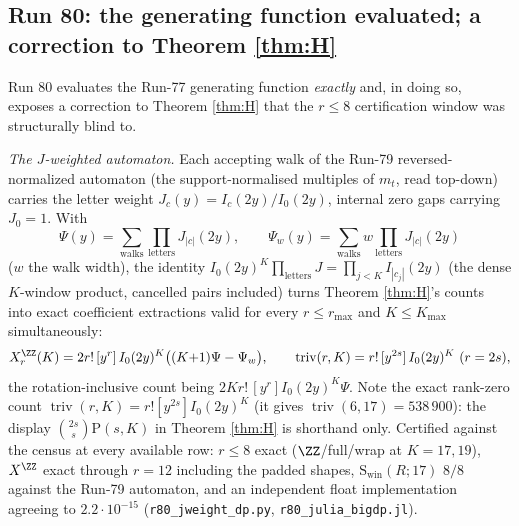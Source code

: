 \subsection{Run 80: the generating function evaluated; a correction to
Theorem \texorpdfstring{\ref{thm:H}}{H}}\label{sub:r80}

Run 80 evaluates the Run-77 generating function \emph{exactly} and, in doing
so, exposes a correction to Theorem \ref{thm:H} that the $r\le8$
certification window was structurally blind to.

\emph{The $J$-weighted automaton.}  Each accepting walk of the
Run-79 reversed-normalized automaton (the support-normalised multiples of
$m_t$, read top-down) carries the letter weight
$J_c(y)=I_c(2y)/I_0(2y)$, internal zero gaps carrying $J_0=1$.  With
\[
  \Psi(y)=\sum_{\text{walks}}\prod_{\text{letters}}J_{|c|}(2y),
  \qquad
  \Psi_w(y)=\sum_{\text{walks}} w\prod_{\text{letters}}J_{|c|}(2y)
\]
($w$ the walk width), the identity
$I_0(2y)^K\prod_{\text{letters}}J=\prod_{j<K}I_{|c_j|}(2y)$ (the dense
$K$-window product, cancelled pairs included) turns Theorem \ref{thm:H}'s
counts into exact coefficient extractions valid for every $r\le r_{\max}$
and $K\le K_{\max}$ simultaneously:
\[
  X^{\ZZ}_r(K)=2r!\,[y^r]\,I_0(2y)^K\bigl((K{+}1)\Psi-\Psi_w\bigr),
  \qquad
  \operatorname{triv}(r,K)=r!\,[y^{2s}]\,I_0(2y)^K\ (r=2s),
\]
the rotation-inclusive count being $2Kr!\,[y^r]I_0(2y)^K\Psi$.  Note the
exact rank-zero count $\operatorname{triv}(r,K)=r![y^{2s}]I_0(2y)^K$ (it
gives $\operatorname{triv}(6,17)=538\,900$): the display
$\binom{2s}{s}\mathrm P(s,K)$ in Theorem \ref{thm:H} is shorthand only.
Certified against the census at every available row: $r\le8$ exact
($\ZZ$/full/wrap at $K=17,19$), $X^{\ZZ}$ exact through $r=12$ including
the padded shapes, $\mathrm S_{\mathrm{win}}(R;17)$ $8/8$ against the Run-79
automaton, and an independent float implementation agreeing to
$2.2\cdot10^{-15}$ (\texttt{r80\_jweight\_dp.py}, \texttt{r80\_julia\_bigdp.jl}).

